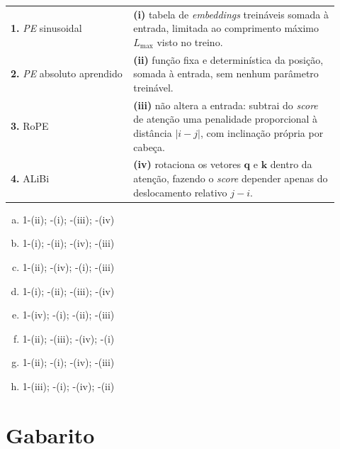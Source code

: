 \documentclass{dlproblemset}
\begin{document}
\begin{enumerate}[I)]
\begin{center}
\begin{tabular}{p{0.34\linewidth} p{0.58\linewidth}}
\textbf{1.} \textit{PE} sinusoidal & \textbf{(i)} tabela de \textit{embeddings} treináveis somada à entrada, limitada ao comprimento máximo $L_{\text{max}}$ visto no treino. \\
\textbf{2.} \textit{PE} absoluto aprendido & \textbf{(ii)} função fixa e determinística da posição, somada à entrada, sem nenhum parâmetro treinável. \\
\textbf{3.} RoPE & \textbf{(iii)} não altera a entrada: subtrai do \textit{score} de atenção uma penalidade proporcional à distância $|i - j|$, com inclinação própria por cabeça. \\
\textbf{4.} ALiBi & \textbf{(iv)} rotaciona os vetores $\mathbf{q}$ e $\mathbf{k}$ dentro da atenção, fazendo o \textit{score} depender apenas do deslocamento relativo $j - i$. \\
\end{tabular}
\end{center}

\begin{enumerate}[a)]
    \item 1-(ii); -(i); -(iii); -(iv)
    \item 1-(i); -(ii); -(iv); -(iii)
    \item 1-(ii); -(iv); -(i); -(iii)
    \item 1-(i); -(ii); -(iii); -(iv)
    \item 1-(iv); -(i); -(ii); -(iii)
    \item 1-(ii); -(iii); -(iv); -(i)
    \item 1-(ii); -(i); -(iv); -(iii)
    \item 1-(iii); -(i); -(iv); -(ii)
\end{enumerate}

\end{enumerate}




\clearpage
\section*{Gabarito}

\end{document}
